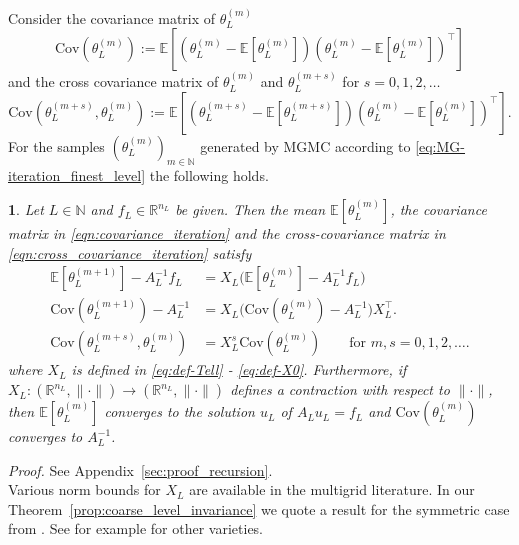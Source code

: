 \documentclass[11pt,english]{article}
\theoremstyle{plain}
\theoremstyle{plain}
\theoremstyle{plain}
\newtheorem{lem}[thm]{\protect\lemmaname}
\theoremstyle{plain}
\numberwithin{equation}{section}
\providecommand{\lemmaname}{Lemma}
\begin{document}
Consider the covariance matrix of $\theta_{L}^{(m)}$
\begin{equation}
	\mathrm{Cov}(\theta_{L}^{(m)}) := \mathbb{E}[(\theta_{L}^{(m)}-\mathbb{E}[\theta_{L}^{(m)}])(\theta_{L}^{(m)}-\mathbb{E}[\theta_{L}^{(m)}])^{\top}]\label{eqn:covariance_iteration}
\end{equation}
and the cross covariance matrix of $\theta_{L}^{(m)}$ and $\theta_{L}^{(m+s)}$ for $s=0,1,2,\dots$
\begin{equation}
	\mathrm{Cov}(\theta_{L}^{(m+s)},\theta_{L}^{(m)}):=\mathbb{E}[(\theta_{L}^{(m+s)}-\mathbb{E}[\theta_{L}^{(m+s)}])(\theta_{L}^{(m)}-\mathbb{E}[\theta_{L}^{(m)}])^{\top}].
	\label{eqn:cross_covariance_iteration}
\end{equation}
For the samples $(\theta_{L}^{(m)})_{m\in\mathbb{N}}$ generated by MGMC according to \eqref{eq:MG-iteration_finest_level} the following holds.
\begin{lem}
	\label{lem:MGidentity-mean-cov}Let $L\in\mathbb{N}$ and $f_{L}\in\mathbb{R}^{n_{L}}$ be given. Then the mean $\mathbb{E}[\theta_{L}^{(m)}]$, the covariance matrix in \eqref{eqn:covariance_iteration} and the cross-covariance matrix in \eqref{eqn:cross_covariance_iteration} satisfy
	\begin{subequations}
		\begin{align}
			\mathbb{E}[\theta_{L}^{(m+1)}]-A_{L}^{-1}f_{L} & =X_{L}\bigl(\mathbb{E}[\theta_{L}^{(m)}]-A_{L}^{-1}f_{L}\bigr)
			\label{eqn:error_iteration}                                                                                                        \\
			\mathrm{Cov}(\theta_{L}^{(m+1)})-A_{L}^{-1}             & =X_{L}\bigl(\mathrm{Cov}(\theta_{L}^{(m)})-A_{L}^{-1}\bigr)X_{L}^{\top}.
			\label{eqn:convergence_iteration}                                                                                                  \\
			\mathrm{Cov}(\theta_{L}^{(m+s)},\theta_{L}^{(m)})       & =X_{L}^{s}\mathrm{Cov}(\theta_{L}^{(m)})
			\qquad\text{for $m,s=0,1,2,\dots$}.
			\label{eq:MG-corr}
		\end{align}
	\end{subequations}
	where $X_{L}$ is defined in \eqref{eq:def-Tell} - \eqref{eq:def-X0}. Furthermore, if $X_{L}\colon(\mathbb{R}^{n_{L}},\|\cdot\|)\to(\mathbb{R}^{n_{L}},\|\cdot\|)$ defines a contraction with respect to $\|\cdot\|$, then $\mathbb{E}[\theta_{L}^{(m)}]$ converges to the solution $u_{L}$ of $A_{L}u_{L}=f_{L}$ and $\mathrm{Cov}(\theta_{L}^{(m)})$ converges to $A_{L}^{-1}$.
\end{lem}
\noindent\textit{Proof.} See Appendix~\ref{sec:proof_recursion}.\\[1ex]
Various norm bounds for $X_{L}$ are available in the multigrid literature. In our Theorem~\ref{prop:coarse_level_invariance} we quote a result for the symmetric case from \cite[Theorem 11.59]{Hackbusch.W_2016_IterativeSolutionLarge}. See for example \cite{Hackbusch.W_1985_MultiGridMethodsApplications} for other varieties.
\end{document}
